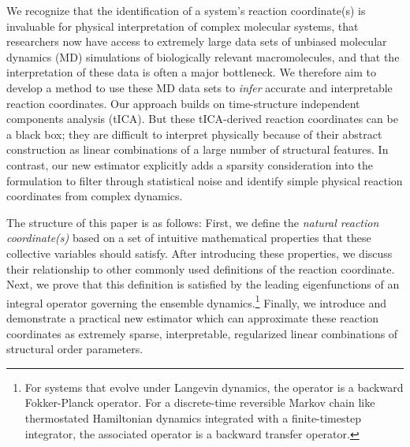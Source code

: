 \documentclass[aip, jcp, reprint, nolinenumbers, twocolumn, nobalancelastpage, nofootinbib]{revtex4-1}
\begin{document}

We recognize that the identification of a system's reaction coordinate(s) is invaluable for physical interpretation of complex molecular systems, that researchers now have access to extremely large data sets of unbiased molecular dynamics (MD) simulations of biologically relevant macromolecules, and that the interpretation of these data is often a major bottleneck.\cite{lane2013milliseconds} We therefore aim to develop a method to use these MD data sets to \emph{infer} accurate and interpretable reaction coordinates. Our approach builds on time-structure independent components analysis (tICA).\cite{schwantes2013improvements, perez2013identification} But these tICA-derived reaction coordinates can be a black box; they are difficult to interpret physically because of their abstract construction as linear combinations of a large number of structural features. In contrast, our new estimator explicitly adds a sparsity consideration into the formulation to filter through statistical noise and identify simple physical reaction coordinates from complex dynamics.

The structure of this paper is as follows: First, we define the \emph{natural reaction coordinate(s)} based on a set of intuitive mathematical properties that these collective variables should satisfy. After introducing these properties, we discuss their relationship to other commonly used definitions of the reaction coordinate. Next, we prove that this definition is satisfied by the leading eigenfunctions of an integral operator governing the ensemble dynamics.\footnote{For systems that evolve under Langevin dynamics, the operator is a backward Fokker-Planck operator.\cite{coifman2008diffusion} For a discrete-time reversible Markov chain like thermostated Hamiltonian dynamics integrated with a finite-timestep integrator, the associated operator is a backward transfer operator.\cite{schutte2001transfer}} Finally, we introduce and demonstrate a practical new estimator which can approximate these reaction coordinates as extremely sparse, interpretable, regularized linear combinations of structural order parameters.

\end{document}
